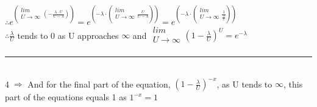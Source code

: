 \documentclass[11pt]{article}
\begin{document}
\linebreak
$\therefore e^{(\begin{matrix} 
	lim \\
	U \xrightarrow{} \infty \\
	\end{matrix}(-\frac{\lambda\cdot U}{U-\lambda}))} = e^{(-\lambda\cdot(\begin{matrix} 
	lim \\
	U \xrightarrow{} \infty \\
	\end{matrix}\frac{U}{U-\lambda}))} = e^{(-\lambda\cdot(\begin{matrix} 
	lim \\
	U \xrightarrow{} \infty \\
	\end{matrix}\frac{1}{\frac{\lambda}{U}}))}$
\\$\therefore \frac{\lambda}{U}$ tends to 0 as U approaches $\infty$ and $\begin{matrix} 
	lim \\
	U \xrightarrow{} \infty \\
	\end{matrix}(1-\frac{\lambda}{U})^U = e^{-\lambda}$
	\vspace{5pt}
\hrule
\vspace{6pt}
\\\textcircled{4}$\Longrightarrow$ And for the final part of the equation, $(1-\frac{\lambda}{U})^{-x}$, as U tends to $\infty$, this part of the equations equals 1 as $1^{-x}=1$
\end{document}
